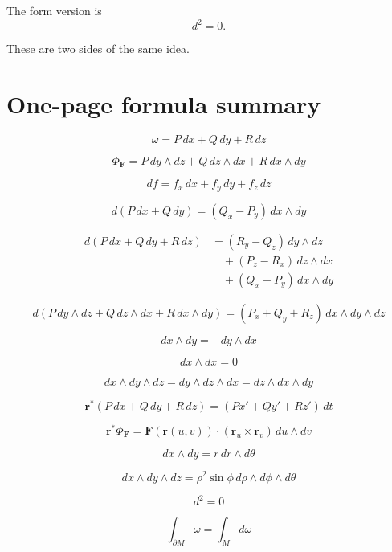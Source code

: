 The form version is
\[
\boxed{
    d^2=0.
}
\]

These are two sides of the same idea.

\section*{One-page formula summary}

\[
\boxed{
    \omega=P\,dx+Q\,dy+R\,dz
}
\]

\[
\boxed{
    \Phi_{\mathbf F}
    =
    P\,dy\wedge dz+Q\,dz\wedge dx+R\,dx\wedge dy
}
\]

\[
\boxed{
    df=f_x\,dx+f_y\,dy+f_z\,dz
}
\]

\[
\boxed{
    d(P\,dx+Q\,dy)
    =
    (Q_x-P_y)\,dx\wedge dy
}
\]

\[
\boxed{
\begin{aligned}
d(P\,dx+Q\,dy+R\,dz)
&=
(R_y-Q_z)\,dy\wedge dz\\
&\quad+
(P_z-R_x)\,dz\wedge dx\\
&\quad+
(Q_x-P_y)\,dx\wedge dy
\end{aligned}
}
\]

\[
\boxed{
    d(P\,dy\wedge dz+Q\,dz\wedge dx+R\,dx\wedge dy)
    =
    (P_x+Q_y+R_z)\,dx\wedge dy\wedge dz
}
\]

\[
\boxed{
    dx\wedge dy=-dy\wedge dx
}
\]

\[
\boxed{
    dx\wedge dx=0
}
\]

\[
\boxed{
    dx\wedge dy\wedge dz
    =
    dy\wedge dz\wedge dx
    =
    dz\wedge dx\wedge dy
}
\]

\[
\boxed{
    \mathbf r^*(P\,dx+Q\,dy+R\,dz)
    =
    (P x'+Q y'+R z')\,dt
}
\]

\[
\boxed{
    \mathbf r^*\Phi_{\mathbf F}
    =
    \mathbf F(\mathbf r(u,v))\cdot(\mathbf r_u\times\mathbf r_v)
    \,du\wedge dv
}
\]

\[
\boxed{
    dx\wedge dy=r\,dr\wedge d\theta
}
\]

\[
\boxed{
    dx\wedge dy\wedge dz
    =
    \rho^2\sin\phi\,
    d\rho\wedge d\phi\wedge d\theta
}
\]

\[
\boxed{
    d^2=0
}
\]

\[
\boxed{
    \int_{\partial M}\omega=\int_M d\omega
}
\]